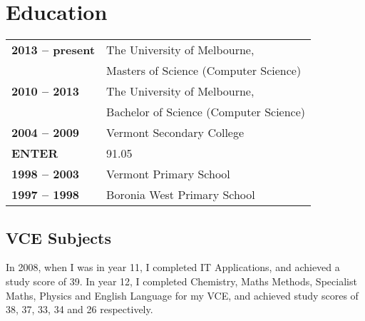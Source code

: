 \documentclass[a4paper]{article}
\begin{document}
\section{Education}
\begin{tabular}{>{\raggedright}m{3cm} l}
    \textbf{2013 -- present} &The University of Melbourne, \\
                             &Masters of Science (Computer Science)\\
    \textbf{2010 -- 2013} &The University of Melbourne, \\
                             &Bachelor of Science (Computer Science)\\
    \textbf{2004 -- 2009} &Vermont Secondary College\\
           \textbf{ENTER} &91.05\\
    \textbf{1998 -- 2003} &Vermont Primary School\\
    \textbf{1997 -- 1998} &Boronia West Primary School\\
\end{tabular}

\subsection{VCE Subjects}
In 2008, when I was in year 11, I completed IT Applications, and achieved a 
study score of 39. In year 12, I completed Chemistry, Maths Methods,
Specialist Maths, Physics and English Language for my VCE, and achieved 
study scores of 38, 37, 33, 34 and 26 respectively.
\end{document}
